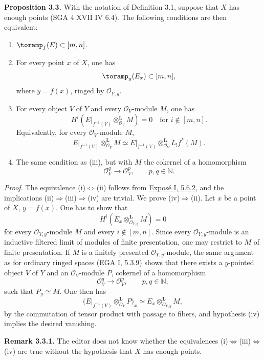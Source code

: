 \textbf{Proposition 3.3.} With the notation of Definition 3.1, suppose that \(X\) has enough points (SGA 4 XVII IV 6.4). The following conditions are then equivalent:
\begin{enumerate}[label=(\roman*)]
\item \(\toramp_f(E)\subset[m,n]\).
\item For every point \(x\) of \(X\), one has
\[
  \toramp_y(E_x)\subset[m,n],
\]
where \(y=f(x)\), ringed by \(\mathcal O_{Y,y}\).
\item For every object \(V\) of \(Y\) and every \(\mathcal O_V\)-module \(M\), one has
\[
  H^i\left(E\vert_{f^{-1}(V)}
  \otimes_{\mathcal O_V}^{\mathbf L}M\right)=0
  \quad\text{for }i\notin[m,n].
\]
Equivalently, for every \(\mathcal O_V\)-module \(M\),
\[
  E\vert_{f^{-1}(V)}\otimes_{\mathcal O_V}^{\mathbf L}M
  \simeq E\vert_{f^{-1}(V)}\otimes_{\mathcal O_V}^{\mathbf L}L_!f^*(M).
\]
\item The same condition as (iii), but with \(M\) the cokernel of a homomorphism
\[
  \mathcal O_V^q\longrightarrow \mathcal O_V^p,
  \qquad p,q\in\mathbb N.
\]
\end{enumerate}

\emph{Proof.} The equivalence (i)\(\Longleftrightarrow\)(ii) follows from \hyperlink{sga6.e01.rem.5-6-2}{Exposé I, 5.6.2}, and the implications (ii)\(\Rightarrow\)(iii)\(\Rightarrow\)(iv) are trivial. We prove (iv)\(\Rightarrow\)(ii). Let \(x\) be a point of \(X\), \(y=f(x)\). One has to show that
\[
  H^i(E_x\otimes_{\mathcal O_{Y,y}}^{\mathbf L}M)=0
\]
for every \(\mathcal O_{Y,y}\)-module \(M\) and every \(i\notin[m,n]\). Since every \(\mathcal O_{Y,y}\)-module is an inductive filtered limit of modules of finite presentation, one may restrict to \(M\) of finite presentation. If \(M\) is a finitely presented \(\mathcal O_{Y,y}\)-module, the same argument as for ordinary ringed spaces (EGA I, 5.3.9) shows that there exists a \(y\)-pointed object \(V\) of \(Y\) and an \(\mathcal O_V\)-module \(P\), cokernel of a homomorphism
\[
  \mathcal O_V^q\longrightarrow\mathcal O_V^p,
  \qquad p,q\in\mathbb N,
\]
such that \(P_y\simeq M\). One then has
\[
  \bigl(E\vert_{f^{-1}(V)}\otimes_{\mathcal O_V}^{\mathbf L}P\bigr)_x
  \simeq
  E_x\otimes_{\mathcal O_{Y,y}}^{\mathbf L}M,
\]
by the commutation of tensor product with passage to fibers, and hypothesis (iv) implies the desired vanishing.

\textbf{Remark 3.3.1.} The editor does not know whether the equivalences (i)\(\Longleftrightarrow\)(iii)\(\Longleftrightarrow\)(iv) are true without the hypothesis that \(X\) has enough points.

